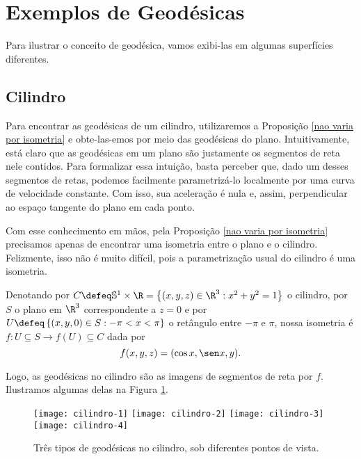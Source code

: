 \section{Exemplos de Geodésicas}

Para ilustrar o conceito de geodésica, vamos exibi-las em algumas superfícies diferentes.

\subsection{Cilindro}

Para encontrar as geodésicas de um cilindro, utilizaremos a Proposição \ref{nao varia por isometria} e obte-las-emos por meio das geodésicas do plano.
Intuitivamente, está claro que as geodésicas em um plano são justamente os segmentos de reta nele contidos.
Para formalizar essa intuição, basta perceber que, dado um desses segmentos de retas, podemos facilmente parametrizá-lo localmente por uma curva de velocidade constante.
Com isso, sua aceleração é nula e, assim, perpendicular ao espaço tangente do plano em cada ponto.

Com esse conhecimento em mãos, pela Proposição \ref{nao varia por isometria} precisamos apenas de encontrar uma isometria entre o plano e o cilindro.
Felizmente, isso não é muito difícil, pois a parametrização usual do cilindro é uma isometria.

Denotando por \( C \defeq \mathbb{S}^{ 1 } \times \R = \left\{ ( x, y, z ) \in \R^{ 3 } : x^2 + y^2 = 1 \right\} \) o cilindro, por \( S \) o plano em \( \R^{ 3 } \) correspondente a \( z = 0 \) e por \( U \defeq \left\{ ( x, y, 0 ) \in S : - \pi < x < \pi \right\} \) o retângulo entre \( -\pi \) e \( \pi \), nossa isometria é \( f : U \subseteq S \to f ( U ) \subseteq C \) dada por
\begin{equation*}
    f ( x, y, z ) = ( \cos x, \sen x, y )
.\end{equation*}

Logo, as geodésicas no cilindro são as imagens de segmentos de reta por \( f \).
Ilustramos algumas delas na Figura \ref{geodesicas cilindro}.

\begin{figure}[htb]
    \begin{center}
        \texttt{[image: cilindro-1]}
        \texttt{[image: cilindro-2]}
        \texttt{[image: cilindro-3]}
        \texttt{[image: cilindro-4]}
    \end{center}
    \caption{Três tipos de geodésicas no cilindro, sob diferentes pontos de vista.}
    \label{geodesicas cilindro}
\end{figure}

